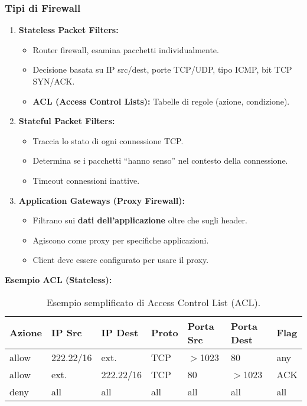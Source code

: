 \documentclass{article}
\begin{document}
\begin{enumerate}
\subsubsection{Tipi di Firewall}
\begin{enumerate}
    \item \textbf{Stateless Packet Filters:}
    \begin{itemize}
        \item Router firewall, esamina pacchetti individualmente.
        \item Decisione basata su IP src/dest, porte TCP/UDP, tipo ICMP, bit TCP SYN/ACK.
        \item \textbf{ACL (Access Control Lists):} Tabelle di regole (azione, condizione).
    \end{itemize}
    \item \textbf{Stateful Packet Filters:}
    \begin{itemize}
        \item Traccia lo stato di ogni connessione TCP.
        \item Determina se i pacchetti \textquotedblleft hanno senso\textquotedblright{} nel contesto della connessione.
        \item Timeout connessioni inattive.
    \end{itemize}
    \item \textbf{Application Gateways (Proxy Firewall):}
    \begin{itemize}
        \item Filtrano sui \textbf{dati dell'applicazione} oltre che sugli header.
        \item Agiscono come proxy per specifiche applicazioni.
        \item Client deve essere configurato per usare il proxy.
    \end{itemize}
\end{enumerate}
\textbf{Esempio ACL (Stateless):}
\begin{table}[H]
    \centering
    \begin{tabular}{|l|l|l|l|l|l|l|}
        \hline
        \textbf{Azione} & \textbf{IP Src} & \textbf{IP Dest} & \textbf{Proto} & \textbf{Porta Src} & \textbf{Porta Dest} & \textbf{Flag} \\ \hline
        allow & 222.22/16 & ext. & TCP & $>$1023 & 80 & any \\ \hline
        allow & ext. & 222.22/16 & TCP & 80 & $>$1023 & ACK \\ \hline
        deny  & all & all & all & all & all & all \\ \hline
    \end{tabular}
    \caption{Esempio semplificato di Access Control List (ACL).}
\end{table}



\end{enumerate}
\end{document}
